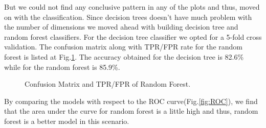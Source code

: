 \documentclass{article} %
\begin{document}
But we could not find any conclusive pattern in any of the plots and thus, moved on with the classification. Since decision trees doesn't have much problem with the number of dimensions we moved ahead with building decision tree and random forest classifiers. For the decision tree classifier we opted for a 5-fold cross validation. The confusion matrix along with TPR/FPR rate for the random forest is listed at Fig.\ref{fig:RFCM}. The accuracy obtained for the decision tree is 82.6\% while for the random forest is 85.9\%.

\begin{figure}[h]
	\begin{center}
	\end{center}
	\caption{Confusion Matrix and TPR/FPR of Random Forest.}
	\label{fig:RFCM}
\end{figure}

By comparing the models with respect to the ROC curve(Fig.\ref{fig:ROC}), we find that the area under the curve for random forest is a little high and thus, random forest is a better model in this scenario.
\end{document}
